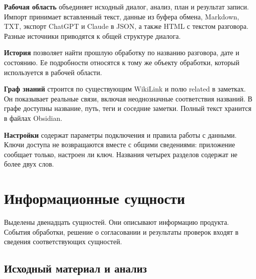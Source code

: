 \textbf{Рабочая область} объединяет исходный диалог, анализ, план и результат записи. Импорт принимает вставленный текст, данные из буфера обмена, Markdown, TXT, экспорт ChatGPT и Claude в JSON, а также HTML с текстом разговора. Разные источники приводятся к общей структуре диалога.


\textbf{История} позволяет найти прошлую обработку по названию разговора, дате и состоянию. Ее подробности относятся к тому же объекту обработки, который используется в рабочей области.


\textbf{Граф знаний} строится по существующим WikiLink и полю related в заметках. Он показывает реальные связи, включая неоднозначные соответствия названий. В графе доступны название, путь, теги и соседние заметки. Полный текст хранится в файлах Obsidian.


\textbf{Настройки} содержат параметры подключения и правила работы с данными. Ключи доступа не возвращаются вместе с общими сведениями: приложение сообщает только, настроен ли ключ. Названия четырех разделов содержат не более двух слов.


\clearpage
\section{Информационные сущности}

Выделены двенадцать сущностей. Они описывают информацию продукта. События обработки, решение о согласовании и результаты проверок входят в сведения соответствующих сущностей.


\subsection{Исходный материал и анализ}

